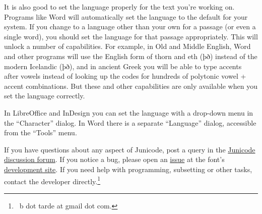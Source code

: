 It is also good to set the language properly for the text you're working on.
Programs like Word will automatically set the language to the default for your system. If you
change to a language other than your own for a passage (or even a single word),
you should set the language for that passage appropriately. This will unlock
a number of capabilities. For example, in Old and Middle English, Word and
other programs will use the English form of thorn and eth ({\eng þð}) instead of
the modern Icelandic ({\icel þð}), and in ancient
Greek you will be able to type accents after vowels instead of looking up
the codes for hundreds of polytonic vowel + accent combinations. But these and other capabilities
are only available when you set the language correctly.

In LibreOffice and InDesign you can set the language with a drop-down menu
in the “Character” dialog. In Word there is a separate “Language” dialog,
accessible from the “Tools” menu.

If you have questions about any aspect of Junicode,
post a query in the \href{https://github.com/psb1558/Junicode-font/discussions}%
{Junicode discussion forum}. If you notice a bug, please open an
\href{https://github.com/psb1558/Junicode-font/issues}{issue} at the font's
\href{https://github.com/psb1558/Junicode-font}{development site}. If you need
help with programming, subsetting or other tasks, contact the developer
directly.\footnote{\ b dot tarde at gmail dot com.}
